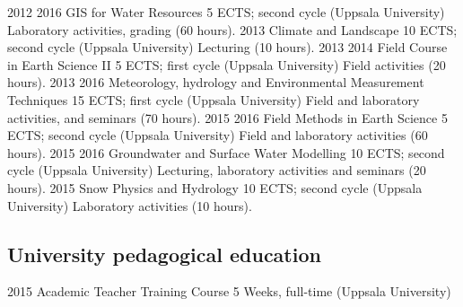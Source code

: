   \teaching
    {2012 \textemdash{} 2016}
    {GIS for Water Resources}
    {5 ECTS; second cycle (Uppsala University)}
    {Laboratory activities, grading (60 hours).}
  \teaching
    {2013}
    {Climate and Landscape}
    {10 ECTS; second cycle (Uppsala University)}
    {Lecturing (10 hours).}
  \teaching
    {2013 \textemdash{} 2014}
    {Field Course in Earth Science II}
    {5 ECTS; first cycle (Uppsala University)}
    {Field activities (20 hours).}
  \teaching
    {2013 \textemdash{} 2016}
    {Meteorology, hydrology and Environmental Measurement Techniques}
    {15 ECTS; first cycle (Uppsala University)}
    {Field and laboratory activities, and seminars (70 hours).}
  \teaching
    {2015 \textemdash{} 2016}
    {Field Methods in Earth Science}
    {5 ECTS; second cycle (Uppsala University)}
    {Field and laboratory activities (60 hours).}
  \teaching
    {2015 \textemdash{} 2016}
    {Groundwater and Surface Water Modelling}
    {10 ECTS; second cycle (Uppsala University)}
    {Lecturing, laboratory activities and seminars (20 hours).}
  \teaching
    {2015}
    {Snow Physics and Hydrology}
    {10 ECTS; second cycle (Uppsala University)}
    {Laboratory activities (10 hours).}

\subsection{University pedagogical education}
  \shortteaching
    {2015}
    {Academic Teacher Training Course}
    {5 Weeks, full-time (Uppsala University)}
